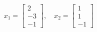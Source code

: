 \begin{question}{4} %
\begin{equation}
x_1 = \begin{bmatrix}2 \\ -3 \\ -1 \end{bmatrix}, \quad x_2 = \begin{bmatrix}1 \\ 1 \\ -1 \end{bmatrix} \nonumber
\end{equation}
\end{question}

